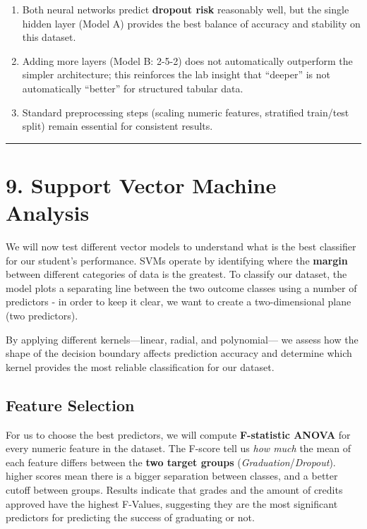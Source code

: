 \documentclass[
]{article}
\providecommand{\tightlist}{%
  \setlength{\itemsep}{0pt}\setlength{\parskip}{0pt}}
\begin{document}
\begin{enumerate}
\def\labelenumi{\arabic{enumi}.}
\tightlist
\item
  Both neural networks predict \textbf{dropout risk} reasonably well,
  but the single hidden layer (Model A) provides the best balance of
  accuracy and stability on this dataset.
\item
  Adding more layers (Model B: 2-5-2) does not automatically outperform
  the simpler architecture; this reinforces the lab insight that
  ``deeper'' is not automatically ``better'' for structured tabular
  data.
\item
  Standard preprocessing steps (scaling numeric features, stratified
  train/test split) remain essential for consistent results.
\end{enumerate}

\begin{center}\rule{0.5\linewidth}{0.5pt}\end{center}

\section{9. Support Vector Machine
Analysis}\label{support-vector-machine-analysis}

We will now test different vector models to understand what is the best
classifier for our student's performance. SVMs operate by identifying
where the \textbf{margin} between different categories of data is the
greatest. To classify our dataset, the model plots a separating line
between the two outcome classes using a number of predictors - in order
to keep it clear, we want to create a two-dimensional plane (two
predictors).

By applying different kernels---linear, radial, and polynomial--- we
assess how the shape of the decision boundary affects prediction
accuracy and determine which kernel provides the most reliable
classification for our dataset.

\subsection{Feature Selection}\label{feature-selection-1}

For us to choose the best predictors, we will compute
\textbf{F-statistic ANOVA} for every numeric feature in the dataset. The
F-score tell us \emph{how much} the mean of each feature differs between
the \textbf{two target groups} (\emph{Graduation}/\emph{Dropout}).
higher scores mean there is a bigger separation between classes, and a
better cutoff between groups. Results indicate that grades and the
amount of credits approved have the highest F-Values, suggesting they
are the most significant predictors for predicting the success of
graduating or not.
\end{document}
